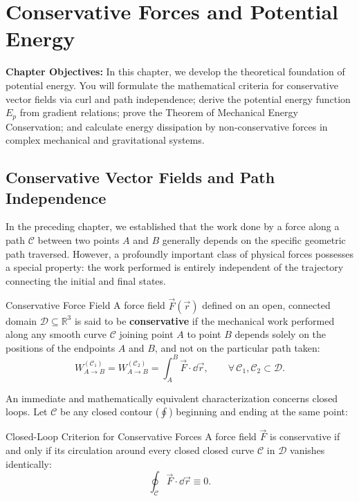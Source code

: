 \chapter{Conservative Forces and Potential Energy}
\label{ch:potential_energy}

\begin{chapterintro}
\textbf{Chapter Objectives:} In this chapter, we develop the theoretical foundation of potential energy. You will formulate the mathematical criteria for conservative vector fields via curl and path independence; derive the potential energy function $E_p$ from gradient relations; prove the Theorem of Mechanical Energy Conservation; and calculate energy dissipation by non-conservative forces in complex mechanical and gravitational systems.
\end{chapterintro}

\section{Conservative Vector Fields and Path Independence}

In the preceding chapter, we established that the work done by a force along a path $\mathcal{C}$ between two points $A$ and $B$ generally depends on the specific geometric path traversed. However, a profoundly important class of physical forces possesses a special property: the work performed is entirely independent of the trajectory connecting the initial and final states.

\begin{definitionbox}{Conservative Force Field}
A force field $\vec{F}(\vec{r})$ defined on an open, connected domain $\mathcal{D} \subseteq \mathbb{R}^3$ is said to be \textbf{conservative} if the mechanical work performed along any smooth curve $\mathcal{C}$ joining point $A$ to point $B$ depends solely on the positions of the endpoints $A$ and $B$, and not on the particular path taken:
\begin{equation}
W_{A \to B}^{(\mathcal{C}_1)} = W_{A \to B}^{(\mathcal{C}_2)} = \int_A^B \vec{F} \cdot \dd\vec{r}, \qquad \forall\, \mathcal{C}_1, \mathcal{C}_2 \subset \mathcal{D}.
\end{equation}
\end{definitionbox}

An immediate and mathematically equivalent characterization concerns closed loops. Let $\mathcal{C}$ be any closed contour ($\oint$) beginning and ending at the same point:
\begin{lawbox}{Closed-Loop Criterion for Conservative Forces}
A force field $\vec{F}$ is conservative if and only if its circulation around every closed closed curve $\mathcal{C}$ in $\mathcal{D}$ vanishes identically:
\begin{equation}
\oint_{\mathcal{C}} \vec{F} \cdot \dd\vec{r} \equiv 0.
\end{equation}
\end{lawbox}

